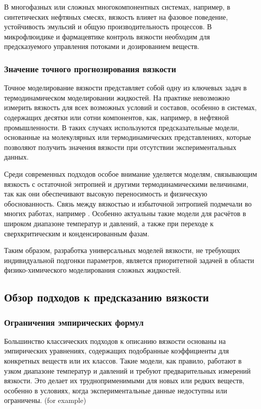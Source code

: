 \documentclass[a4paper,12pt]{article}
\begin{document}
В многофазных или сложных многокомпонентных системах, например, в синтетических нефтяных смесях, вязкость влияет на фазовое поведение, устойчивость эмульсий и общую производительность процессов. В микрофлюидике и фармацевтике контроль вязкости необходим для предсказуемого управления потоками и дозированием веществ.

    \subsubsection{Значение точного прогнозирования вязкости}

Точное моделирование вязкости представляет собой одну из ключевых задач в термодинамическом моделировании жидкостей. На практике невозможно измерить вязкость для всех возможных условий и составов, особенно в системах, содержащих десятки или сотни компонентов, как, например, в нефтяной промышленности. В таких случаях используются предсказательные модели, основанные на молекулярных или термодинамических представлениях, которые позволяют получить значения вязкости при отсутствии экспериментальных данных.

Среди современных подходов особое внимание уделяется моделям, связывающим вязкость с остаточной энтропией и другими термодинамическими величинами, так как они обеспечивают высокую переносимость и физическую обоснованность. Связь между вязкостью и избыточной энтропией подмечали во многих работах, например \cite{taib2020residual}. Особенно актуальны такие модели для расчётов в широком диапазоне температур и давлений, а также при переходе к сверхкритическим и конденсированным фазам.

Таким образом, разработка универсальных моделей вязкости, не требующих индивидуальной подгонки параметров, является приоритетной задачей в области физико-химического моделирования сложных жидкостей.

  \subsection{Обзор подходов к предсказанию вязкости}

    \subsubsection{Ограничения эмпирических формул}
Большинство классических подходов к описанию вязкости основаны на эмпирических уравнениях, содержащих подобранные коэффициенты для конкретных веществ или их классов. Такие модели, как правило, работают в узком диапазоне температур и давлений и требуют предварительных измерений вязкости. Это делает их трудноприменимыми для новых или редких веществ, особенно в условиях, когда экспериментальные данные недоступны или ограничены. (for example)
\end{document}
